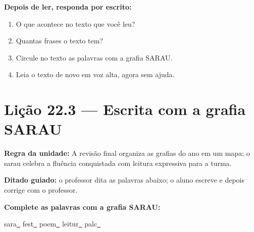 \textbf{Depois de ler, responda por escrito:}
\begin{enumerate}

  \item O que acontece no texto que você leu?
  \begin{center}
  \underline{\hspace{12cm}}
  \end{center}

  \item Quantas frases o texto tem?
  \begin{center}
  \underline{\hspace{12cm}}
  \end{center}

  \item Circule no texto as palavras com a grafia SARAU.

  \item Leia o texto de novo em voz alta, agora sem ajuda.

\end{enumerate}

\section{Lição 22.3 --- Escrita com a grafia SARAU}

\noindent\textbf{Regra da unidade:} A revisão final organiza as grafias do ano em um mapa; o sarau celebra a fluência conquistada com leitura expressiva para a turma.


\noindent\textbf{Ditado guiado:} o professor dita as palavras abaixo; o aluno escreve e depois corrige com o professor.

\begin{center}
  \underline{\hspace{2.3cm}} \quad \underline{\hspace{2.3cm}} \quad \underline{\hspace{2.3cm}} \quad \underline{\hspace{2.3cm}}

  \underline{\hspace{2.3cm}} \quad \underline{\hspace{2.3cm}} \quad \underline{\hspace{2.3cm}} \quad \underline{\hspace{2.3cm}}
\end{center}

\noindent\textbf{Complete as palavras com a grafia SARAU:}
\begin{center}
  sara\underline{~} \quad fest\underline{~} \quad poem\underline{~} \quad leitur\underline{~} \quad palc\underline{~}
\end{center}

